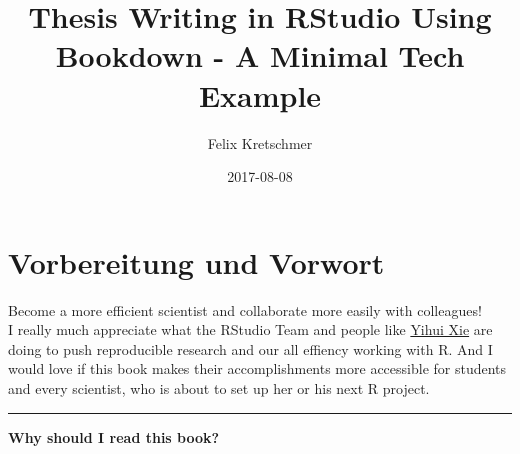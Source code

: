 \documentclass[]{book}
\title{Thesis Writing in RStudio Using Bookdown - A Minimal Tech Example}
\author{Felix Kretschmer}
\date{2017-08-08}
\theoremstyle{definition}
\theoremstyle{definition}
\theoremstyle{remark}
\begin{document}
\maketitle

{
\setcounter{tocdepth}{1}
\tableofcontents
}
\listoftables
\listoffigures
\chapter*{Vorbereitung und Vorwort}\label{vorbereitung-und-vorwort}

Become a more efficient scientist and collaborate more easily with
colleagues!\\
I really much appreciate what the RStudio Team and people like
\href{https://yihui.name/}{Yihui Xie} are doing to push reproducible
research and our all effiency working with R. And I would love if this
book makes their accomplishments more accessible for students and every
scientist, who is about to set up her or his next R project.

\begin{center}\rule{0.5\linewidth}{\linethickness}\end{center}

\textbf{Why should I read this book?}
\end{document}
